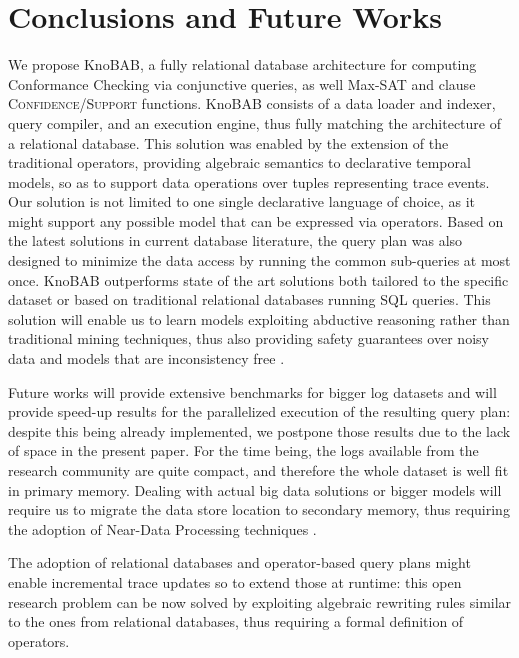 \vspace{-4mm}\section{Conclusions and Future Works}
We propose KnoBAB, a fully relational database architecture for computing Conformance Checking via conjunctive queries, as well Max-SAT and clause \textsc{Confidence}/\textsc{Support} functions.  KnoBAB consists of a data loader and indexer, query compiler, and an execution engine, thus fully matching the architecture of a relational database. This solution was enabled by the extension of the traditional \LTLf operators, providing algebraic semantics to declarative temporal models, so as to support data operations over tuples representing trace  events. Our solution is not limited to one single declarative language of choice, as it might support any possible model that can be expressed via \xLTLf operators. Based on the latest solutions in current database literature, the query plan was also designed to minimize the data access by running the common sub-queries at most once.
%
KnoBAB outperforms state of the art solutions both tailored to the specific dataset or based on traditional relational databases running SQL queries.  This solution will enable us to learn models exploiting abductive reasoning rather than traditional mining techniques, thus also providing safety guarantees over noisy data and models that are inconsistency free \cite{PicadoDTL20}. 

Future works will provide extensive benchmarks for bigger log datasets and will provide speed-up results for the parallelized execution of the resulting query plan: despite this being already implemented, we postpone those results due to the lack of space in the present paper. For the time being, the logs available from the research community are quite compact, and therefore the whole dataset is well fit in primary memory. Dealing with actual big data solutions or bigger models will require us to migrate the data store location to secondary memory, thus requiring the adoption of Near-Data Processing techniques \cite{GuYBJLYKKYCJC16}. 

The adoption of relational databases and operator-based query plans might enable incremental trace updates so to extend those at runtime: this open research problem  can be now  solved by exploiting algebraic rewriting rules similar to the ones from relational databases, thus requiring a formal definition of \xLTLf operators. 

